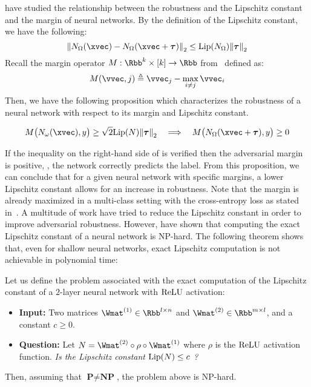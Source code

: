 \citet{tsuzuku2018lipschitz} have studied the relationship between the robustness and the Lipschitz constant and the margin of neural networks. 
By the definition of the Lipschitz constant, we have the following:
\begin{equation}
  \norm{N_\Omega(\xvec) - N_\Omega(\xvec + \adv)}_2 \leq \lip{N_\Omega} \norm{\adv}_2
\end{equation}
Recall the margin operator $\margin: \Rbb^k \times [k] \rightarrow \Rbb$ from~ defined as:
\begin{equation}
  \margin(\vvec, j) \triangleq \vvec_j - \max_{i \neq j} \vvec_i
\end{equation}
Then, we have the following proposition which characterizes the robustness of a neural network with respect to its margin and Lipschitz constant.
\begin{proposition}
  \begin{equation} \label{equation:ch3-margin_guarded_area}
    \margin \big( N_\omega(\xvec), y \big) \geq \sqrt{2} \lip{N} \norm{\adv}_2 \quad \Longrightarrow \quad \margin \big( N_\Omega(\xvec + \adv), y \big) \geq 0
  \end{equation}
  \removespace
\end{proposition}
\noindent
If the inequality on the right-hand side of  is verified then the adversarial margin is positive, \ie, the network correctly predicts the label. 
From this proposition, we can conclude that for a given neural network with specific margins, a lower Lipschitz constant allows for an increase in robustness. 
Note that the margin is already maximized in a multi-class setting with the cross-entropy loss as stated in~\citet{hein2017formal}.
A multitude of work have tried to reduce the Lipschitz constant in order to improve adversarial robustness.
However, \citet{scaman2018lipschitz} have shown that computing the exact Lipschitz constant of a neural network is NP-hard.
The following theorem shows that, even for shallow neural networks, exact Lipschitz computation is not achievable in polynomial time:
\begin{theorem} \label{theorem:ch3-lipschitz_computation}
  Let us define the problem associated with the exact computation of the Lipschitz constant of a $2$-layer neural network with $\mathrm{ReLU}$ activation:
  \begin{itemize}%
    \item[] \textbf{Input:} Two matrices $\Wmat^{(1)} \in \Rbb^{l \times n}$ and $\Wmat^{(2)} \in \Rbb^{m \times l}$, and a constant $c \geq 0$.
    \item[] \textbf{Question:} Let $N = \Wmat^{(2)} \circ \rho \circ \Wmat^{(1)}$ where $\rho$ is the $\mathrm{ReLU}$ activation function. \emph{Is the Lipschitz constant $\lip{N} \leq c$ ?}
  \end{itemize}
  Then, assuming that $\textbf{P} \neq \textbf{NP}$, the problem above is NP-hard. 
\end{theorem}


